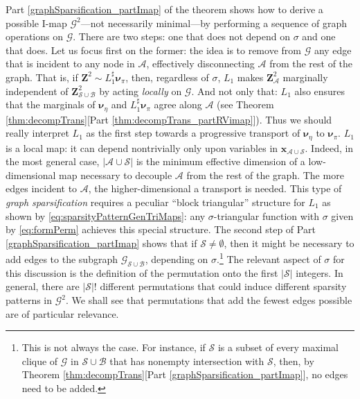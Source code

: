 \documentclass[twoside,11pt]{article}
\newcommand{\genm}{\boldsymbol{\nu} }   %
\newcommand{\Bc}{\mathcal{B}}
\newcommand{\Ac}{\mathcal{A}}
\newcommand{\Sc}{\mathcal{S}}
\newcommand{\xb}{\boldsymbol{x}}
\newcommand{\Zb}{\boldsymbol{Z}}
\newcommand{\Gcb}{\boldsymbol{\mathcal{G}}}
\newcommand{\lmap}{L} %
\newcommand{\Aset}{ \Ac }
\newcommand{\Bset}{ \Bc }
\newcommand{\Sset}{ \Sc }
\newcommand{\pull}{^\sharp}
\begin{document}
%
%
%
%
%
%
%
%
%
%
Part \ref{graphSparsification_partImap} of the theorem 
shows how to derive a possible I-map $\Gcb^2$---not necessarily
minimal---by
performing a sequence of graph operations on
$\Gcb$.
There are two steps: one that does not depend on $\sigma$ and one that does.
%
Let us focus first on the former: the idea is to
remove from $\Gcb$ any edge that is incident to any
node in $\Aset$, effectively disconnecting $\Aset$ from the rest of the graph.
%
That is, if $\Zb^{2} \sim  \lmap_1\pull \genm_\pi$, then, regardless of $\sigma$, 
$\lmap_1$ makes $\Zb_{\Aset}^2$ marginally independent of
$\Zb_{\Sset \cup \Bset}^2$ by 
acting {\it locally} on $\Gcb$.
And not only that: $\lmap_1$ also ensures that the marginals of $\genm_\eta$ and
$\lmap_1\pull \genm_\pi$ agree along $\Aset$ 
(see Theorem \ref{thm:decompTrans}[Part \ref{thm:decompTrans_partRVimap}]).
%
Thus we should really interpret $\lmap_1$ as the first step towards a progressive
transport of %
$\genm_\eta$ to $\genm_\pi$.
$\lmap_1$ is a local map: it can
depend nontrivially only upon variables in $\xb_{\Aset \cup \Sset}$.
Indeed, in the most general case, $| \Aset \cup \Sset|$
is the minimum effective dimension of a
low-dimensional map  
necessary to decouple $\Aset$ from the rest of
the graph.  
The more edges incident to $\Aset$, the higher-dimensional a
transport is needed.
%
%
%
%
%
%
%
%
This type of {\it graph sparsification} requires a peculiar
``block triangular'' structure for $\lmap_1$ as shown by
\eqref{eq:sparsityPatternGenTriMaps}:
any $\sigma$-triangular function with $\sigma$ given by \eqref{eq:formPerm}
achieves this special structure.
%
The second step of Part
\ref{graphSparsification_partImap} shows that 
if $\Sset \neq \emptyset$, then it might be necessary to add edges
to the subgraph $\Gcb_{\Sset \cup \Bset}$, depending on $\sigma$.\footnote{
This is not always the case.  
For instance, if $\Sset$ is a   subset of every maximal
clique of $\Gcb$ in $\Sset \cup \Bset$ that has nonempty intersection with $\Sset$, then,
by Theorem \ref{thm:decompTrans}[Part \ref{graphSparsification_partImap}], 
no edges need to be added.
%
}  
%
%
%
%
The relevant aspect of $\sigma$ for this discussion is
the definition of the permutation onto the first $|\Sset|$ integers. 
In general, there are  $|\Sset|!$ different permutations that could
induce different sparsity patterns in $\Gcb^2$.
We shall see that permutations that add the fewest edges possible are
of particular relevance.
\end{document}
